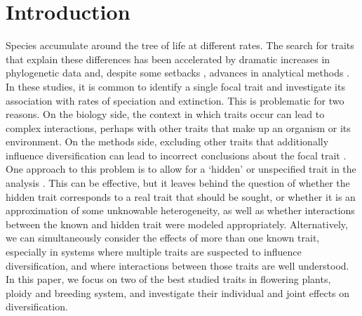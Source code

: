 \section{Introduction}

Species accumulate around the tree of life at different rates.
The search for traits that explain these differences has been accelerated by dramatic increases in phylogenetic data and, despite some setbacks \citep{maddison_2015, rabosky_2015}, advances in analytical methods \citep{maddison_2007, fitzjohn_2009, goldberg_2012, beaulieu_2016}. %
In these studies, it is common to identify a single focal trait and investigate its association with rates of speciation and extinction. %
This is problematic for two reasons.
On the biology side, the context in which traits occur can lead to complex interactions, perhaps with other traits that make up an organism or its environment.
On the methods side, excluding other traits that additionally influence diversification can lead to incorrect conclusions about the focal trait \citep{rabosky_2015, beaulieu_2016}.
One approach to this problem is to allow for a `hidden' or unspecified trait in the analysis \citep{beaulieu_2016}. %
This can be effective, but it leaves behind the question of whether the hidden trait corresponds to a real trait that should be sought, or whether it is an approximation of some unknowable heterogeneity, as well as whether interactions between the known and hidden trait were modeled appropriately.
Alternatively, we can simultaneously consider the effects of more than one known trait, especially in systems where multiple traits are suspected to influence diversification, and where interactions between those traits are well understood.
In this paper, we focus on two of the best studied traits in flowering plants, ploidy and breeding system, and investigate their individual and joint effects on diversification.

